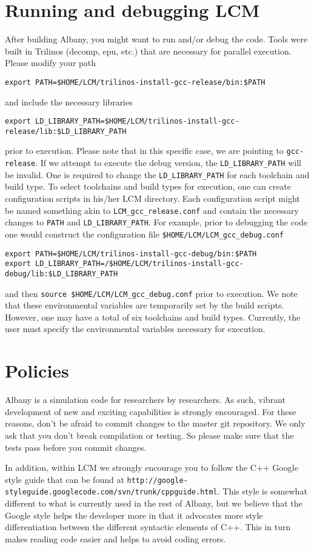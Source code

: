 \documentclass[10pt,a4paper]{article} \usepackage[utf8]{inputenc}
\begin{document}
\section{Running and debugging LCM} 

After building Albany, you might want to run and/or debug the code. 
Tools were built in Trilinos (decomp, epu, etc.) that are necessary for parallel execution. 
Please modify your path
\begin{verbatim}
export PATH=$HOME/LCM/trilinos-install-gcc-release/bin:$PATH
\end{verbatim}
and include the necessary libraries
\begin{verbatim}
export LD_LIBRARY_PATH=$HOME/LCM/trilinos-install-gcc-release/lib:$LD_LIBRARY_PATH
\end{verbatim}
prior to execution. Please note that in this specific case, we are pointing to 
\verb+gcc-release+.
If we attempt to execute the debug version, the \verb+LD_LIBRARY_PATH+ will be invalid.
One is required to change the  \verb+LD_LIBRARY_PATH+ for each toolchain and build type.
To select toolchains and build types for execution, one can create configuration scripts in his/her LCM
directory. Each configuration script might be named something akin to \verb+LCM_gcc_release.conf+ 
and contain the necessary changes to \verb+PATH+ and \verb+LD_LIBRARY_PATH+. For example,
prior to debugging the code one would construct the configuration file  
\verb+$HOME/LCM/LCM_gcc_debug.conf+
\begin{verbatim}
export PATH=$HOME/LCM/trilinos-install-gcc-debug/bin:$PATH
export LD_LIBRARY_PATH=/$HOME/LCM/trilinos-install-gcc-debug/lib:$LD_LIBRARY_PATH
\end{verbatim}
and then \verb+source $HOME/LCM/LCM_gcc_debug.conf+ prior to execution. We note that these 
environmental variables are temporarily set by the build scripts. However, one may have a total of six
toolchains and build types. Currently, the user must specify the environmental variables 
necessary for execution. 

\section{Policies}
Albany is a simulation code for researchers by researchers. As such,
vibrant development of new and exciting capabilities is strongly
encouraged. For these reasons, don't be afraid to commit changes to
the master git repository. We only ask that you don't break
compilation or testing. So please make sure that the tests pass before
you commit changes.

In addition, within LCM we strongly encourage you to follow the C++
Google style guide that can be found at
\verb+http://google-styleguide.googlecode.com/svn/trunk/cppguide.html+.
This style is somewhat different to what is currently used in the rest
of Albany, but we believe that the Google style helps the developer
more in that it advocates more style differentiation between the
different syntactic elements of C++. This in turn makes reading code
easier and helps to avoid coding errors.
\end{document}
